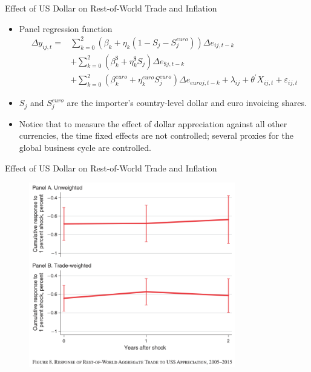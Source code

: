 \documentclass{beamer}
\begin{document}
\begin{frame}{Effect of US Dollar on Rest-of-World Trade and Inflation}
\begin{itemize}
    \item Panel regression function
        \begin{equation*}
            \begin{aligned}
                \Delta y_{i j, t}= &\sum_{k=0}^{2}\left(\beta_{k}+\eta_{k}\left(1-S_{j}-S_{j}^{euro}\right)\right) \Delta e_{i j, t-k}\\ 
                &+\sum_{k=0}^{2}\left(\beta_{k}^{\$}+\eta_{k}^{\$} S_{j}\right) \Delta e_{\$ j, t-k}\\
                &+\sum_{k=0}^{2}\left(\beta_{k}^{euro}+\eta_{k}^{euro} S_{j}^{euro}\right) \Delta e_{euro j, t-k} +\lambda_{i j}+\theta^{\prime} X_{i j, t}+\varepsilon_{i j, t}
            \end{aligned}
        \end{equation*}
    \item $S_j$ and $S_j^{euro}$ are the importer's country-level dollar and euro invoicing shares.
    \item Notice that to measure the effect of dollar appreciation against all other currencies, the time fixed effects are not controlled; several proxies for the global business cycle are controlled.
    \end{itemize}
\end{frame}
\begin{frame}{Effect of US Dollar on Rest-of-World Trade and Inflation}
    \begin{figure}[htp]
        \centering
        \includegraphics[width=9cm]{Figure8.png}
    \end{figure}
\end{frame}
\end{document}
